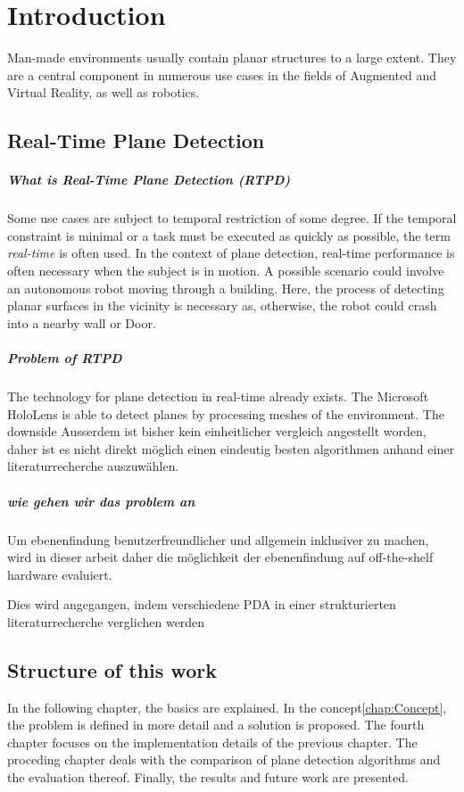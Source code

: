\documentclass[main.tex]{subfiles}
\begin{document}
\chapter{Introduction}\label{chap:Introduction}

Man-made environments usually contain planar structures to a large extent.
They are a central component in numerous use cases in the fields of Augmented and Virtual Reality, as well as robotics.


\section{Real-Time Plane Detection}
\paragraph*{What is Real-Time Plane Detection (RTPD)}
Some use cases are subject to temporal restriction of some degree. If the temporal constraint is minimal or a task must be executed as quickly as possible, the term \textit{real-time} is often used. 
In the context of plane detection, real-time performance is often necessary when the subject is in motion. 
A possible scenario could involve an autonomous robot moving through a building. Here, the process of detecting planar surfaces in the vicinity is necessary as, otherwise, the robot could crash into a nearby wall or Door.

\paragraph*{Problem of RTPD}
The technology for plane detection in real-time already exists. The Microsoft HoloLens is able to detect planes by processing meshes of the environment. 
The downside
Ausserdem ist bisher kein einheitlicher vergleich angestellt worden, daher ist es nicht direkt möglich einen eindeutig besten algorithmen anhand einer literaturrecherche auszuwählen.


\paragraph*{wie gehen wir das problem an}
Um ebenenfindung benutzerfreundlicher und allgemein inklusiver zu machen, wird in dieser
arbeit daher die möglichkeit der ebenenfindung auf off-the-shelf hardware evaluiert.

Dies wird angegangen, indem verschiedene PDA in einer strukturierten literaturrecherche verglichen werden


\section{Structure of this work}


In the following chapter, the basics are explained. In the concept\ref{chap:Concept}, the problem is defined in more detail and a solution is proposed. 
The fourth chapter focuses on the implementation details of the previous chapter.
The proceding chapter deals with the comparison of plane detection algorithms and the evaluation thereof.
Finally, the results and future work are presented. 
\end{document}

